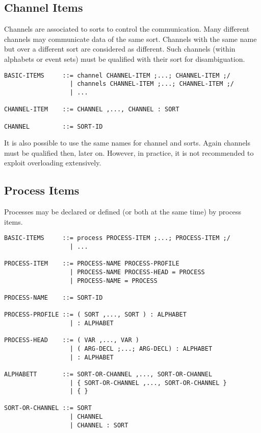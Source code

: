 \documentclass{article}
\begin{document}
\subsection{Channel Items}

Channels are associated to sorts to control the communication. Many different
channels may communicate data of the same sort. Channels with the same name
but over a different sort are considered as different. Such channels (within
alphabets or event sets) must be qualified with their sort for
disambiguation.

\begin{verbatim}
BASIC-ITEMS     ::= channel CHANNEL-ITEM ;...; CHANNEL-ITEM ;/
                  | channels CHANNEL-ITEM ;...; CHANNEL-ITEM ;/
                  | ...

CHANNEL-ITEM    ::= CHANNEL ,..., CHANNEL : SORT

CHANNEL         ::= SORT-ID
\end{verbatim}

It is also possible to use the same names for channel and sorts. Again
channels must be qualified then, later on. However, in practice, it is not
recommended to exploit overloading extensively.

\subsection{Process Items}

Processes may be declared or defined (or both at the same time) by process items.

\begin{verbatim}
BASIC-ITEMS     ::= process PROCESS-ITEM ;...; PROCESS-ITEM ;/
                  | ...

PROCESS-ITEM    ::= PROCESS-NAME PROCESS-PROFILE
                  | PROCESS-NAME PROCESS-HEAD = PROCESS
                  | PROCESS-NAME = PROCESS

PROCESS-NAME    ::= SORT-ID

PROCESS-PROFILE ::= ( SORT ,..., SORT ) : ALPHABET
                  | : ALPHABET

PROCESS-HEAD    ::= ( VAR ,..., VAR )
                  | ( ARG-DECL ;...; ARG-DECL) : ALPHABET
                  | : ALPHABET

ALPHABETT       ::= SORT-OR-CHANNEL ,..., SORT-OR-CHANNEL
                  | { SORT-OR-CHANNEL ,..., SORT-OR-CHANNEL }
                  | { }

SORT-OR-CHANNEL ::= SORT
                  | CHANNEL
                  | CHANNEL : SORT
\end{verbatim}
\end{document}
